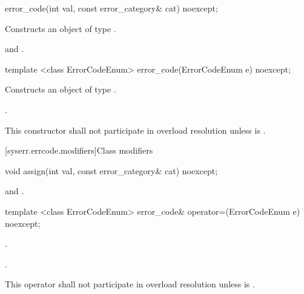 %
\begin{itemdecl}
error_code(int val, const error_category& cat) noexcept;
\end{itemdecl}

\begin{itemdescr}
\pnum
\effects Constructs an object of type .

\pnum
\postconditions {} and .
\end{itemdescr}

%
\begin{itemdecl}
template <class ErrorCodeEnum>
  error_code(ErrorCodeEnum e) noexcept;
\end{itemdecl}

\begin{itemdescr}
\pnum
\effects Constructs an object of type .

\pnum
\postconditions {}.

\pnum
\remarks This constructor shall not participate in overload resolution unless\linebreak
{} is .
\end{itemdescr}

[syserr.errcode.modifiers]{Class  modifiers}

%
\begin{itemdecl}
void assign(int val, const error_category& cat) noexcept;
\end{itemdecl}

\begin{itemdescr}
\pnum
\postconditions {} and .
\end{itemdescr}

%
\begin{itemdecl}
template <class ErrorCodeEnum>
    error_code& operator=(ErrorCodeEnum e) noexcept;
\end{itemdecl}

\begin{itemdescr}
\pnum
\postconditions {}.

\pnum
\returns {}.

\pnum
\remarks This operator shall not participate in overload resolution unless\linebreak
{} is .
\end{itemdescr}


